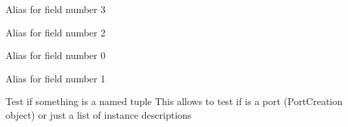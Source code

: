 \documentclass[a4paper,10pt,english]{sphinxmanual}
\begin{document}
\begin{fulllineitems}
\begin{quote}
\begin{description}
\begin{itemize}
\end{itemize}

\end{description}\end{quote}

\begin{fulllineitems}
\label{\detokenize{photonics:photonics.PortCreation.length}}
Alias for field number 3

\end{fulllineitems}


\begin{fulllineitems}
\label{\detokenize{photonics:photonics.PortCreation.rot}}
Alias for field number 2

\end{fulllineitems}


\begin{fulllineitems}
\label{\detokenize{photonics:photonics.PortCreation.x}}
Alias for field number 0

\end{fulllineitems}


\begin{fulllineitems}
\label{\detokenize{photonics:photonics.PortCreation.y}}
Alias for field number 1

\end{fulllineitems}


\end{fulllineitems}


\begin{fulllineitems}
\label{\detokenize{photonics:photonics.isnamedtupleinstance}}
Test if something is a named tuple
This allows to test if  is a port (PortCreation object) or just a list of instance descriptions

\end{fulllineitems}
\end{document}
